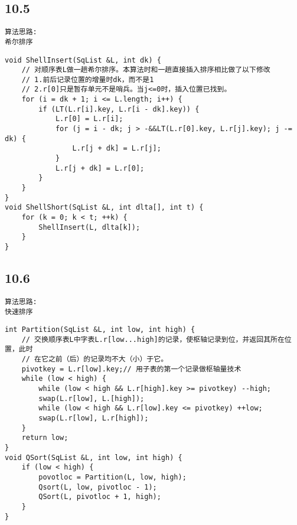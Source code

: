 \subsection{10.5}
\begin{lstlisting}[basicstyle=\small\ttfamily, caption={}, numbers=none]
算法思路:
希尔排序
\end{lstlisting}
\begin{lstlisting}[basicstyle=\small\ttfamily, caption={}, numbers=none]
void ShellInsert(SqList &L, int dk) {
	// 对顺序表L做一趟希尔排序。本算法时和一趟直接插入排序相比做了以下修改
	// 1.前后记录位置的增量时dk，而不是1
	// 2.r[0]只是暂存单元不是哨兵。当j<=0时，插入位置已找到。
	for (i = dk + 1; i <= L.length; i++) {
		if (LT(L.r[i].key, L.r[i - dk].key)) {
			L.r[0] = L.r[i];
			for (j = i - dk; j > -&&LT(L.r[0].key, L.r[j].key); j -= dk) {
				L.r[j + dk] = L.r[j];
			}
			L.r[j + dk] = L.r[0];
		}
	}
}
void ShellShort(SqList &L, int dlta[], int t) {
	for (k = 0; k < t; ++k) {
		ShellInsert(L, dlta[k]);
	}
}
\end{lstlisting}


\subsection{10.6}
\begin{lstlisting}[basicstyle=\small\ttfamily, caption={}, numbers=none]
算法思路:
快速排序
\end{lstlisting}
\begin{lstlisting}[basicstyle=\small\ttfamily, caption={}, numbers=none]
int Partition(SqList &L, int low, int high) {
	// 交换顺序表L中字表L.r[low...high]的记录，使枢轴记录到位，并返回其所在位置，此时
	// 在它之前（后）的记录均不大（小）于它。
	pivotkey = L.r[low].key;// 用子表的第一个记录做枢轴量技术
	while (low < high) {
		while (low < high && L.r[high].key >= pivotkey) --high;
		swap(L.r[low], L.[high]);
		while (low < high && L.r[low].key <= pivotkey) ++low;
		swap(L.r[low], L.r[high]);
	}
	return low;
}
void QSort(SqList &L, int low, int high) {
	if (low < high) {
		povotloc = Partition(L, low, high);
		Qsort(L, low, pivotloc - 1);
		QSort(L, pivotloc + 1, high);
	}
}
\end{lstlisting}


